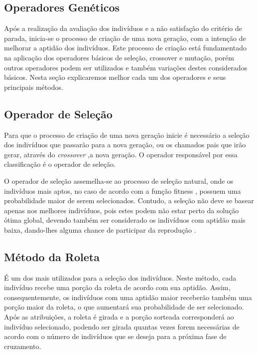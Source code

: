 \subsection{Operadores Genéticos}

Após a realização da avaliação dos indivíduos e a não satisfação do critério de parada, inicia-se o processo de criação de uma nova geração, com a intenção de melhorar a aptidão dos indivíduos. Este processo de criação está fundamentado na aplicação dos operadores básicos de seleção, crossover e mutação, porém outros operadores podem ser utilizados e também variações destes considerados básicos. Nesta seção explicaremos melhor cada um dos operadores e seus principais métodos.


\subsection{Operador de Seleção}


Para que o processo de criação de uma nova geração inicie é necessário a seleção dos indivíduos que passarão para a nova geração, ou os chamados pais que irão gerar, através do \textit{crossover} ,a nova geração. O operador responsável por essa classificação é o operador de seleção.



O operador de seleção assemelha-se ao processo de seleção natural, onde os indivíduos mais aptos, no caso de acordo com a função fitness , possuem uma probabilidade maior de serem selecionados. Contudo, a seleção não deve se basear apenas nos melhores indivíduos, pois estes podem não estar perto da solução ótima global, devendo também ser considerado os indivíduos com aptidão mais baixa, dando-lhes alguma chance de participar da reprodução \cite{mognon04}.


\subsection{Método da Roleta}

É um dos mais utilizados para a seleção dos indivíduos.  Neste método, cada indivíduo recebe uma porção da roleta de acordo com sua aptidão. Assim, consequentemente, os indivíduos com uma aptidão maior receberão também uma porção maior da roleta, o que aumentará sua probabilidade de ser selecionado.  Após as atribuições,  a roleta é girada e a porção sorteada corresponderá ao indivíduo selecionado, podendo ser girada quantas vezes forem necessárias de acordo com o número de indivíduos que se deseja para a próxima fase de cruzamento.

